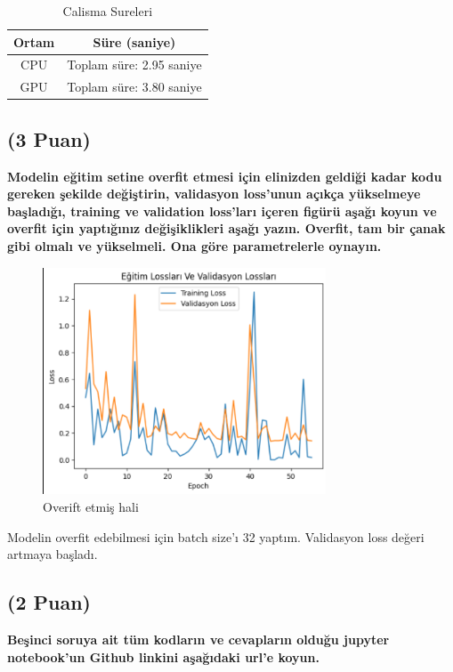 \documentclass[11pt]{article}
\begin{document}
\begin{table}[ht!]
    \centering
    \caption{Calisma Sureleri}
    \begin{tabular}{c|c}
        Ortam & Süre (saniye) \\\hline
        CPU & Toplam süre: 2.95 saniye \\
        GPU & Toplam süre: 3.80 saniye\\
    \end{tabular}
    \label{tab:my_table}
\end{table}

\subsection{(3 Puan)} \textbf{Modelin eğitim setine overfit etmesi için elinizden geldiği kadar kodu gereken şekilde değiştirin, validasyon loss'unun açıkça yükselmeye başladığı, training ve validation loss'ları içeren figürü aşağı koyun ve overfit için yaptığınız değişiklikleri aşağı yazın. Overfit, tam bir çanak gibi olmalı ve yükselmeli. Ona göre parametrelerle oynayın.}

\begin{figure}[ht!]
    \centering
    \includegraphics[width=0.75\textwidth]{overfitting-loss.png}
    \caption{Overift etmiş hali}
    \label{fig:my_pic}
\end{figure}

Modelin overfit edebilmesi için batch size'ı 32 yaptım. 
Validasyon loss değeri artmaya başladı.



\subsection{(2 Puan)} \textbf{Beşinci soruya ait tüm kodların ve cevapların olduğu jupyter notebook'un Github linkini aşağıdaki url'e koyun.}
\end{document}
